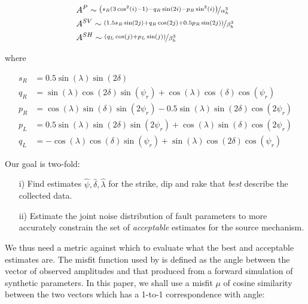 \documentclass[preprint]{seismica}
\begin{document}
    \begin{align} \label{eq:eq1}
      \nonumber &A^P \sim \nicefrac{\left( s_R(3\cos^2(i) - 1) - q_R\sin(2i) - p_R\sin^2(i)\right)}{\alpha_h^3}\\
      &A^{SV} \sim \nicefrac{\left( 1.5 s_R\sin(2j) + q_R\cos(2j) + 0.5 p_R\sin(2j) \right)}{\beta_h^3}\\
      \nonumber &A^{SH} \sim \nicefrac{\left( q_L\cos(j) + p_L\sin(j) \right)}{\beta_h^3}
    \end{align}

    where

    \begin{align} \label{eq:eq2}
      \nonumber s_R &= 0.5 \sin(\lambda) \sin(2\delta)\\
      \nonumber q_R &= \sin(\lambda) \cos(2\delta) \sin(\psi_r) + \cos(\lambda) \cos(\delta) \cos(\psi_r)\\
      p_R &= \cos(\lambda) \sin(\delta) \sin(2\psi_r) - 0.5\sin(\lambda) \sin(2\delta) \cos(2\psi_r)\\
      \nonumber p_L &= 0.5\sin(\lambda) \sin(2\delta) \sin(2\psi_r) + \cos(\lambda) \sin(\delta) \cos(2\psi_r)\\
      \nonumber q_L &= -\cos(\lambda) \cos(\delta) \sin(\psi_r) + \sin(\lambda) \cos(2\delta) \cos(\psi_r)
    \end{align}

    Our goal is two-fold:
    \begin{enumerate}
      \item [i)]
        Find estimates $\widehat{\psi}, \widehat{\delta}, \widehat{\lambda}$ for the strike, dip
        and rake that \textit{best} describe the collected data.

      \item [ii)]
        Estimate the joint noise distribution of fault parameters to more accurately constrain the
        set of \textit{acceptable} estimates for the source mechanism.
        
    \end{enumerate}

    We thus need a metric against which to evaluate what the best and acceptable estimates are. The
    misfit function used by \citet{sita_potential_2022} is defined as the angle between the vector of
    observed amplitudes and that produced from a forward simulation of synthetic parameters.
    In this paper, we shall use a misfit $\mu$ of cosine similarity between the two vectors which has a
    1-to-1 correspondence with angle:
\end{document}
